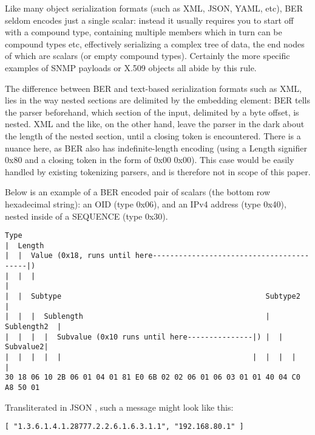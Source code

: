 Like many object serialization formats (such as XML, JSON, YAML, etc), BER 
seldom encodes just a single scalar: instead it usually requires you to 
start off with a compound type, containing multiple members which in turn 
can be compound types etc, effectively serializing a complex tree of data, 
the end nodes of which are scalars (or empty compound types).
Certainly the more specific examples 
of SNMP payloads or X.509 objects all abide by this rule.

The difference between BER and text-based serialization formats such as 
XML, lies in the way nested sections are delimited by the embedding 
element: BER tells the parser beforehand, which section of the input, 
delimited by a byte offset, is nested. XML and the like, on the other 
hand, leave the parser in the dark about the length of the nested section, 
until a closing token is encountered. There is a nuance here, as BER
also has indefinite-length encoding (using a Length signifier 0x80 and
a closing token in the form of 0x00 0x00). This case would be easily
handled by existing tokenizing parsers, and is therefore not in scope of
this paper.

Below is an example of a BER encoded pair of scalars
(the bottom row hexadecimal string): an
OID (type 0x06), and an IPv4 address (type 0x40), nested inside of
a SEQUENCE (type 0x30).

\begin{changemargin}{-60mm}{0mm}
\begin{myquote}
\begin{verbatim}
Type
|  Length
|  |  Value (0x18, runs until here-----------------------------------------|)
|  |  |                                                                    |
|  |  Subtype                                               Subtype2       |
|  |  |  Sublength                                          |  Sublength2  |
|  |  |  |  Subvalue (0x10 runs until here---------------|) |  |  Subvalue2|
|  |  |  |  |                                            |  |  |  |        |
30 18 06 10 2B 06 01 04 01 81 E0 6B 02 02 06 01 06 03 01 01 40 04 C0 A8 50 01
\end{verbatim}
\end{myquote}
\end{changemargin}

Transliterated in JSON \cite{bib:json},
such a message might look like this:

\begin{changemargin}{-60mm}{0mm}
\begin{myquote}
\begin{verbatim}
[ "1.3.6.1.4.1.28777.2.2.6.1.6.3.1.1", "192.168.80.1" ]
\end{verbatim}
\end{myquote}
\end{changemargin}

